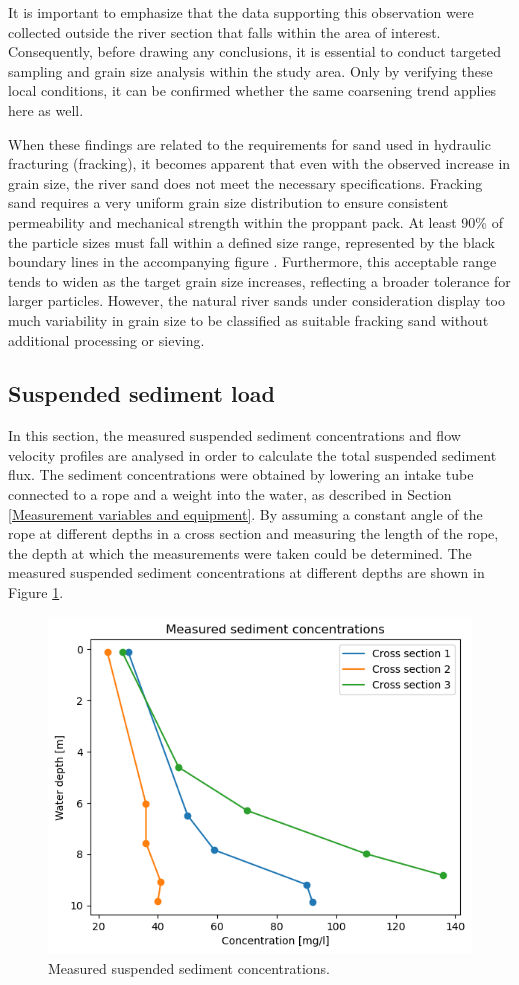 It is important to emphasize that the data supporting this observation were collected outside the river section that falls within the area of interest. Consequently, before drawing any conclusions, it is essential to conduct targeted sampling and grain size analysis within the study area. Only by verifying these local conditions, it can be confirmed whether the same coarsening trend applies here as well.

When these findings are related to the requirements for sand used in hydraulic fracturing (fracking), it becomes apparent that even with the observed increase in grain size, the river sand does not meet the necessary specifications. Fracking sand requires a very uniform grain size distribution to ensure consistent permeability and mechanical strength within the proppant pack. At least 90\% of the particle sizes must fall within a defined size range, represented by the black boundary lines in the accompanying figure \autocite{bensonFracSandUnited2015}.
Furthermore, this acceptable range tends to widen as the target grain size increases, reflecting a broader tolerance for larger particles. However, the natural river sands under consideration display too much variability in grain size to be classified as suitable fracking sand without additional processing or sieving.


\subsection{Suspended sediment load}
In this section, the measured suspended sediment concentrations and flow velocity profiles are analysed in order to calculate the total suspended sediment flux. The sediment concentrations were obtained by lowering an intake tube connected to a rope and a weight into the water, as described in Section \ref{Measurement variables and equipment}. By assuming a constant angle of the rope at different depths in a cross section and measuring the length of the rope, the depth at which the measurements were taken could be determined. The measured suspended sediment concentrations at different depths are shown in Figure \ref{fig:Measured suspended sediment concentrations}.

\begin{figure}[H]
    \centering
    \includegraphics[width=0.75\linewidth]{figures/ch6/Measured_SSC.png}
    \caption{Measured suspended sediment concentrations.}
    \label{fig:Measured suspended sediment concentrations}
\end{figure}

